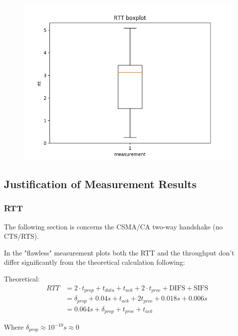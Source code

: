 \documentclass{article}
\begin{document}
\begin{figure}[h] \label{usrp-fails2-5}
	\includegraphics[width=\textwidth]{usrp_fail2_rtt_boxplot}
\end{figure} 

\clearpage

\subsection{Justification of Measurement Results}

\subsubsection{RTT}

The following section is concerns the CSMA/CA two-way handshake (no CTS/RTS).

In the "flawless" measurement plots both the RTT and the throughput don't differ significantly from the theoretical calculation following:

Theoretical:
\begin{equation*}
\begin{split}
	RTT & = 2 \cdot t_{prop}+t_{data}+t_{ack}+2\cdot t_{proc}+\text{DIFS}+\text{SIFS} \\
		& = \delta_{prop}+0.04s+t_{ack}+2t_{proc}+0.018s+0.006s \\
		& = 0.064s + \delta_{prop} + t_{proc} +t_{ack}
\end{split}
\end{equation*} 

Where $\delta_{prop} \approx 10^{-10}s \approx 0 $
\end{document}
